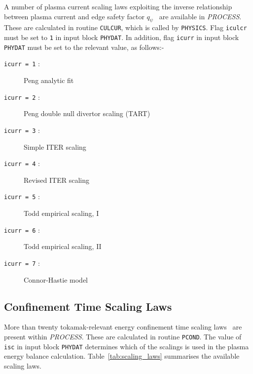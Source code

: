 \documentclass[11pt,a4paper]{report}
\makeatletter
\newcommand{\PSD}{\mbox{\it PROCESS}\@.\/ }
\makeatother
\begin{document}
A number of plasma current scaling laws exploiting the inverse relationship
between plasma current and edge safety factor $q_{\psi}$~\cite{172} are
available in \PSD These are calculated in routine {\tt CULCUR}, which is
called by {\tt PHYSICS}.  Flag {\tt iculcr} must be set to {\tt 1} in input
block {\tt PHYDAT}. In addition, flag {\tt icurr} in input block {\tt PHYDAT}
must be set to the relevant value, as follows:-
\begin{description}
\item [{\tt icurr = 1} :] Peng analytic fit
\item [{\tt icurr = 2} :] Peng double null divertor scaling (TART)
\item [{\tt icurr = 3} :] Simple ITER scaling
\item [{\tt icurr = 4} :] Revised ITER scaling
\item [{\tt icurr = 5} :] Todd empirical scaling, I
\item [{\tt icurr = 6} :] Todd empirical scaling, II
\item [{\tt icurr = 7} :] Connor-Hastie model
\end{description}

\subsection{Confinement Time Scaling Laws}

More than twenty tokamak-relevant energy confinement time scaling
laws~\cite{IPDG,172,H90P,iter93h} are present within \PSD These are calculated
in routine {\tt PCOND}. The value of {\tt isc} in input block {\tt PHYDAT}
determines which of the scalings is used in the plasma energy balance
calculation.  Table~\ref{tab:scaling_laws} summarises the available scaling
laws.

\end{document}
